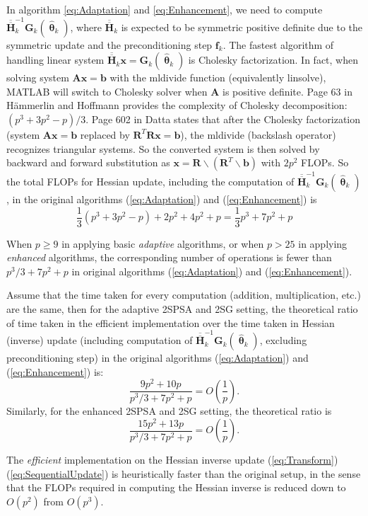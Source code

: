 \documentclass[conference,10.3cpt]{IEEEtran}
\newcommand{\bG}{\bm{G}}
\newcommand{\ooH}{\bm{\overline{\overline{H}}}}
\newcommand{\htheta}{\bm{\hat{\uptheta}}}
\begin{document}
In algorithm \ref{eq:Adaptation} and \ref{eq:Enhancement}, we need to compute $\ooH_k^{-1} \bG_k(\htheta_k)$, where $\ooH_k$ is expected to be symmetric positive definite due to the symmetric update and the preconditioning step $\bm{f}_k$. The fastest algorithm of handling linear system $\ooH_k\bm{x}=\bG_k(\htheta_k)$ is Cholesky factorization. In fact, when solving system $\bm{Ax}=\bm{b}$ with the mldivide function (equivalently linsolve), MATLAB will switch to Cholesky solver when $\bm{A}$ is positive definite. Page 63 in Hämmerlin and Hoffmann \cite{Hämmerlin2012} provides the complexity of Cholesky decomposition: $(p^3+3p^2-p)/3$. Page 602 in Datta \cite{Datta2008} states that after the Cholesky factorization (system $\bm{Ax}=\bm{b}$ replaced by $\bm{R}^T\bm{Rx}=\bm{b}$), the mldivide (backslash operator) recognizes triangular systems. So the converted system is then solved by backward and forward substitution as $\bm{x} = \bm{R} \backslash (\bm{R}^T \backslash \bm{b})$ with $2p^2$ FLOPs. So the total FLOPs for Hessian update, including the computation of $\ooH_k^{-1} \bG_k(\htheta_k)$, in the original algorithms (\ref{eq:Adaptation}) and (\ref{eq:Enhancement}) is
\begin{equation}
	\frac{1}{3}(p^3+3p^2-p)+2p^2+4p^2+p=\frac{1}{3}p^3+7p^2+p
\end{equation}

When $p\ge9$ in applying basic \textit{adaptive} algorithms, or when $p>25$ in applying \textit{enhanced} algorithms, the corresponding number
of operations is fewer than $p^3/3+7p^2+p$ in original algorithms (\ref{eq:Adaptation}) and (\ref{eq:Enhancement}).

Assume that the time taken for every computation (addition, multiplication, etc.) are the same, then for the adaptive 2SPSA and 2SG setting, the theoretical ratio of time taken in the efficient implementation over the time taken in Hessian (inverse) update (including computation of $\ooH_k^{-1} \bG_k(\htheta_k)$, excluding preconditioning step) in the original algorithms (\ref{eq:Adaptation}) and (\ref{eq:Enhancement}) is:
\begin{equation} \label{eq:ratio1}
\frac{9p^2+10p}{p^3/3+7p^2+p} = O(\frac{1}{p}).
\end{equation}
Similarly, for the enhanced 2SPSA and 2SG setting, the theoretical ratio is
\begin{equation}\label{eq:ratio2}
\frac{15p^2+13p}{p^3/3+7p^2+p} = O(\frac{1}{p}).
\end{equation}

The \textit{efficient} implementation on the Hessian inverse update (\ref{eq:Transform})\text{--}(\ref{eq:SequentialUpdate}) is heuristically faster than the original setup, in the sense that the FLOPs required in computing the Hessian inverse is reduced down to $O(p^2)$ from $O(p^3)$.
\end{document}
